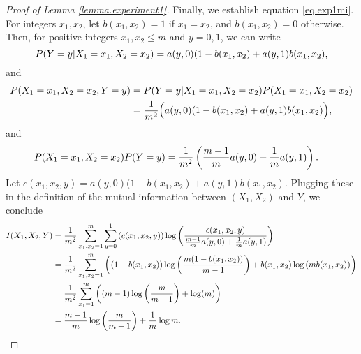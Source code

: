 \begin{proof}[Proof of Lemma \ref{lemma.experiment1}]
	Finally, we establish equation \eqref{eq.exp1mi}.
	For integers $x_1, x_2$, 
	let 
	$b(x_1, x_2) = 1$ if $x_1 = x_2$,
	and $b(x_1, x_2) = 0$ otherwise.
	Then, 
	for positive integers $x_1, x_2 \leq m$ and $y=0, 1$,
	we can write
	\begin{equation*}
		\Prob(Y=y \vert X_1 = x_1, X_2 = x_2)
		=
		a(y, 0)( 1 - b(x_1, x_2)
		+
		a(y, 1) b(x_1, x_2),
	\end{equation*}
	and
	\begin{equation*}
		\begin{split}
		\Prob(X_1 = x_1, X_2 = x_2, Y = y)
			&=
		\Prob(Y=y \vert X_1 = x_1, X_2 = x_2)
		\Prob(X_1 = x_1, X_2 = x_2)
		\\
			&=
		\frac{1}{m\squared}
		\Big(
		a(y, 0)( 1 - b(x_1, x_2)
		+
		a(y, 1) b(x_1, x_2)
		\Big),
		\end{split}
	\end{equation*}
	and
	\begin{equation*}
		\begin{split}
			\Prob(X_1 = x_1, X_2 = x_2) \Prob(Y = y)
			&=
			\frac{1}{m\squared}
			\left(
			\frac{m-1}{m} a(y, 0)
			+
			\frac{1}{m} a(y, 1)
			\right).
		\end{split}
	\end{equation*}
	Let 
	$c(x_1, x_2, y) = 
			a(y, 0)( 1 - b(x_1, x_2)
			+
			a(y, 1) b(x_1, x_2)
			$.
	Plugging these in the definition of the mutual information between $(X_1, X_2)$ and $Y$,
	we conclude
	\begin{equation*}
		\begin{split}
			I(X_1, X_2; Y)
			& =
			\frac{1}{m\squared}
			\sum_{x_1, x_2 = 1}^{m}
			\sum_{y=0}^{1}
			\left(
			c(x_1, x_2, y)
			\right)
			\log
			\left(
			\frac
			{
			c(x_1, x_2, y)
			}
			{
				\frac{m-1}{m} a(y, 0) + \frac{1}{m} a(y, 1)
			}
			\right)
			\\
			& = 
			\frac{1}{m\squared}
			\sum_{x_1, x_2 = 1}^{m}
			\left(
			(1 - b(x_1, x_2))
			\log
			\left(
			\frac{m(1-b(x_1, x_2))}{m-1}
			\right)
			+
			b(x_1, x_2)
			\log
			\left(
			m b(x_1, x_2)
			\right)
			\right)
			\\
			& =
			\frac{1}{m\squared}
			\sum_{x_1 = 1}^{m}
			\left(
			(m-1)\log\left(\frac{m}{m-1}\right) + \log(m)
			\right)
			\\
			& =
			\frac{m-1}{m} \log\left(\frac{m}{m-1}\right)
			+
			\frac{1}{m}\log m
			.
		\end{split}
	\end{equation*}

\end{proof}
